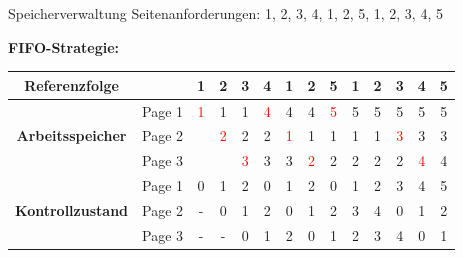 \documentclass[german]{spicker}
\begin{document}
\begin{example}{Speicherverwaltung}
    Seitenanforderungen: 1, 2, 3, 4, 1, 2, 5, 1, 2, 3, 4, 5

    \textbf{FIFO-Strategie:}

    \begin{tabular}{|c|c|c|c|c|c|c|c|c|c|c|c|c|c|}
        \hline
        \multicolumn{1}{|c}{\textbf{Referenzfolge}} & \multicolumn{1}{c|}{} & 1                  & 2                  & 3                  & 4                  & 1                  & 2                  & 5                  & 1 & 2 & 3                  & 4                  & 5 \\
        \hline
        \hline
        \multirow{3}{*}{\textbf{Arbeitsspeicher}}   & Page 1                & \textcolor{red}{1} & 1                  & 1                  & \textcolor{red}{4} & 4                  & 4                  & \textcolor{red}{5} & 5 & 5 & 5                  & 5                  & 5 \\
                                                    & Page 2                &                    & \textcolor{red}{2} & 2                  & 2                  & \textcolor{red}{1} & 1                  & 1                  & 1 & 1 & \textcolor{red}{3} & 3                  & 3 \\
                                                    & Page 3                &                    &                    & \textcolor{red}{3} & 3                  & 3                  & \textcolor{red}{2} & 2                  & 2 & 2 & 2                  & \textcolor{red}{4} & 4 \\
        \hline
        \hline
        \multirow{3}{*}{\textbf{Kontrollzustand}}   & Page 1                & 0                  & 1                  & 2                  & 0                  & 1                  & 2                  & 0                  & 1 & 2 & 3                  & 4                  & 5 \\
                                                    & Page 2                & -                  & 0                  & 1                  & 2                  & 0                  & 1                  & 2                  & 3 & 4 & 0                  & 1                  & 2 \\
                                                    & Page 3                & -                  & -                  & 0                  & 1                  & 2                  & 0                  & 1                  & 2 & 3 & 4                  & 0                  & 1 \\
        \hline
    \end{tabular}


\end{example}
\end{document}
